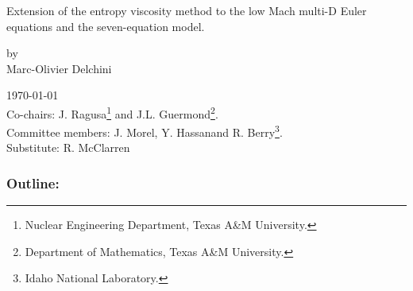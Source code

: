 \documentclass[xcolor=dvipsnames,10pt]{beamer}
\begin{document}
%
\begin{frame}
\begin{center}
Extension of the entropy viscosity method to the low Mach multi-D Euler equations and the seven-equation model.
\begin{center}
by \\
Marc-Olivier Delchini
\end{center}
\today \\

Co-chairs: J. Ragusa\footnote{Nuclear Engineering Department, Texas A\&M University.} and J.L. Guermond\footnote{Department of Mathematics, Texas A\&M University.}. \\
Committee members: J. Morel\footnotemark[1], Y. Hassan\footnotemark[1] and R. Berry\footnote{Idaho National Laboratory.}. \\
Substitute: R. McClarren
\end{center}
\end{frame}
%
\begin{frame}
	\frametitle{Outline:}
	\tableofcontents
\end{frame}
\end{document}
